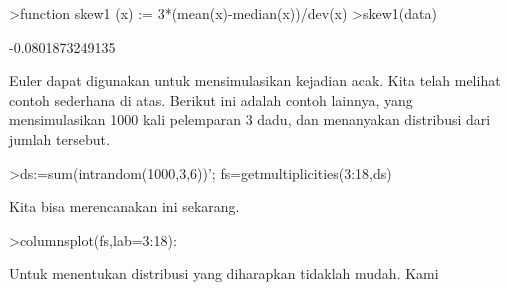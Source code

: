 \documentclass[a4paper,10pt]{article}
\begin{document}
\begin{eulernotebook}
\begin{eulercomment}
\begin{eulercomment}
\begin{eulercomment}
\begin{eulercomment}
\begin{eulercomment}
\begin{eulercomment}
\begin{eulercomment}
\begin{eulercomment}
\begin{eulercomment}
\begin{eulercomment}
\begin{eulercomment}
\begin{eulercomment}
\begin{eulercomment}
\begin{eulercomment}
\begin{eulercomment}
\begin{eulercomment}
\begin{eulercomment}
\begin{eulercomment}
\begin{eulercomment}
\begin{eulercomment}
\begin{eulercomment}
\begin{eulercomment}
\begin{eulercomment}
\begin{eulercomment}
\begin{eulercomment}
\begin{eulercomment}
\begin{eulercomment}
\begin{eulercomment}
\begin{eulercomment}
\begin{eulercomment}
\begin{eulercomment}
\begin{eulercomment}
\begin{eulercomment}
\begin{eulercomment}
\begin{eulercomment}
\begin{eulercomment}
\begin{eulercomment}
\begin{eulercomment}
\begin{eulercomment}
\begin{eulercomment}
\begin{eulercomment}
\begin{eulercomment}
\begin{eulercomment}
\begin{eulercomment}
\begin{eulerprompt}
>function skew1 (x) := 3*(mean(x)-median(x))/dev(x)
>skew1(data)
\end{eulerprompt}
\begin{euleroutput}
  -0.0801873249135
\end{euleroutput}
\begin{eulercomment}
Euler dapat digunakan untuk mensimulasikan kejadian acak. Kita telah
melihat contoh sederhana di atas. Berikut ini adalah contoh lainnya,
yang mensimulasikan 1000 kali pelemparan 3 dadu, dan menanyakan
distribusi dari jumlah tersebut.
\end{eulercomment}
\begin{eulerprompt}
>ds:=sum(intrandom(1000,3,6))';  fs=getmultiplicities(3:18,ds)
\end{eulerprompt}
\begin{euleroutput}
  [5,  17,  35,  44,  75,  97,  114,  116,  143,  116,  104,  53,  40,
  22,  13,  6]
\end{euleroutput}
\begin{eulercomment}
Kita bisa merencanakan ini sekarang.
\end{eulercomment}
\begin{eulerprompt}
>columnsplot(fs,lab=3:18):
\end{eulerprompt}
\begin{eulercomment}
Untuk menentukan distribusi yang diharapkan tidaklah mudah. Kami

\end{eulercomment}
\end{eulercomment}
\end{eulercomment}
\end{eulercomment}
\end{eulercomment}
\end{eulercomment}
\end{eulercomment}
\end{eulercomment}
\end{eulercomment}
\end{eulercomment}
\end{eulercomment}
\end{eulercomment}
\end{eulercomment}
\end{eulercomment}
\end{eulercomment}
\end{eulercomment}
\end{eulercomment}
\end{eulercomment}
\end{eulercomment}
\end{eulercomment}
\end{eulercomment}
\end{eulercomment}
\end{eulercomment}
\end{eulercomment}
\end{eulercomment}
\end{eulercomment}
\end{eulercomment}
\end{eulercomment}
\end{eulercomment}
\end{eulercomment}
\end{eulercomment}
\end{eulercomment}
\end{eulercomment}
\end{eulercomment}
\end{eulercomment}
\end{eulercomment}
\end{eulercomment}
\end{eulercomment}
\end{eulercomment}
\end{eulercomment}
\end{eulercomment}
\end{eulercomment}
\end{eulercomment}
\end{eulercomment}
\end{eulercomment}
\end{eulernotebook}
\end{document}
